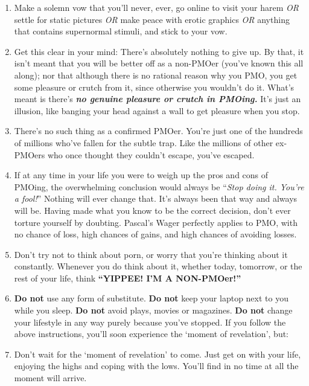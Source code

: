 \documentclass[
]{book}
\begin{document}
\begin{enumerate}
\def\labelenumi{\arabic{enumi}.}
\item
  Make a solemn vow that you'll never, ever, go online to visit your harem \emph{OR} settle for static pictures \emph{OR} make peace with erotic graphics \emph{OR} anything that contains supernormal stimuli, and stick to your vow.
\item
  Get this clear in your mind: There's absolutely nothing to give up. By that, it isn't meant that you will be better off as a non-PMOer (you've known this all along); nor that although there is no rational reason why you PMO, you get some pleasure or crutch from it, since otherwise you wouldn't do it. What's meant is there's \textbf{\emph{no genuine pleasure or crutch in PMOing.}} It's just an illusion, like banging your head against a wall to get pleasure when you stop.
\item
  There's no such thing as a confirmed PMOer. You're just one of the hundreds of millions who've fallen for the subtle trap. Like the millions of other ex-PMOers who once thought they couldn't escape, you've escaped.
\item
  If at any time in your life you were to weigh up the pros and cons of PMOing, the overwhelming conclusion would always be ``\emph{Stop doing it. You're a fool!}'' Nothing will ever change that. It's always been that way and always will be. Having made what you know to be the correct decision, don't ever torture yourself by doubting. Pascal's Wager perfectly applies to PMO, with no chance of loss, high chances of gains, and high chances of avoiding losses.
\item
  Don't try not to think about porn, or worry that you're thinking about it constantly. Whenever you do think about it, whether today, tomorrow, or the rest of your life, think \textbf{``YIPPEE! I'M A NON-PMOer!''}
\item
  \textbf{Do not} use any form of substitute. \textbf{Do not} keep your laptop next to you while you sleep. \textbf{Do not} avoid plays, movies or magazines. \textbf{Do not} change your lifestyle in any way purely because you've stopped. If you follow the above instructions, you'll soon experience the `moment of revelation', but:
\item
  Don't wait for the `moment of revelation' to come. Just get on with your life, enjoying the highs and coping with the lows. You'll find in no time at all the moment will arrive.
\end{enumerate}
\end{document}
